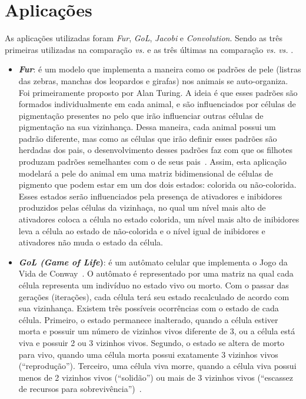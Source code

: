 \section{Aplicações}
\label{sec:aplicacoes}

As aplicações utilizadas foram \textit{Fur}, \textit{GoL}, \textit{Jacobi} e \textit{Convolution}. Sendo as três primeiras utilizadas na comparação \async \textit{vs.} \ipc e as três últimas na comparação \async \textit{vs.} \gpu \textit{vs.} \cpu.

\begin{itemize}
  \item \textbf{\textit{Fur}}: é um modelo que implementa a maneira como os padrões de pele (listras das zebras, manchas dos leopardos e girafas) nos animais se auto-organiza. Foi primeiramente proposto por Alan Turing. A ideia é que esses padrões são formados individualmente em cada animal, e são influenciados por células de pigmentação presentes no pelo que irão influenciar outras células de pigmentação na sua vizinhança. Dessa maneira, cada animal possui um padrão diferente, mas como as células que irão definir esses padrões são herdadas dos pais, o desenvolvimento desses padrões faz com que os filhotes produzam padrões semelhantes com o de seus pais~\cite{NetLogoFur}. Assim, esta aplicação modelará a pele do animal em uma matriz bidimensional de células de pigmento que podem estar em um dos dois estados: colorida ou não-colorida. Esses estados serão influenciados pela presença de ativadores e inibidores produzidos pelas células da vizinhaça, no qual um nível mais alto de ativadores coloca a célula no estado colorida, um nível mais alto de inibidores leva a célula ao estado de não-colorida e o nível igual de inibidores e ativadores não muda o estado da célula.

  \item \textbf{\textit{GoL (Game of Life})}: é um autômato celular que implementa o Jogo da Vida de Conway~\cite{gardner70}. O autômato é representado por uma matriz na qual cada célula representa um indivíduo no estado vivo ou morto. Com o passar das gerações (iterações), cada célula terá seu estado recalculado de acordo com sua vizinhança. Existem três possíveis ocorrências com o estado de cada célula. Primeiro, o estado permanece inalterado, quando a célula estiver morta e possuir um número de vizinhos vivos diferente de 3, ou a célula está viva e possuir 2 ou 3 vizinhos vivos. Segundo, o estado se altera de morto para vivo, quando uma célula morta possui exatamente 3 vizinhos vivos (``reprodução''). Terceiro, uma célula viva morre, quando a célula viva possui menos de 2 vizinhos vivos (``solidão'') ou mais de 3 vizinhos vivos (``escassez de recursos para sobrevivência'')~\cite{CPE:CPE3479}. 
  

\end{itemize}
